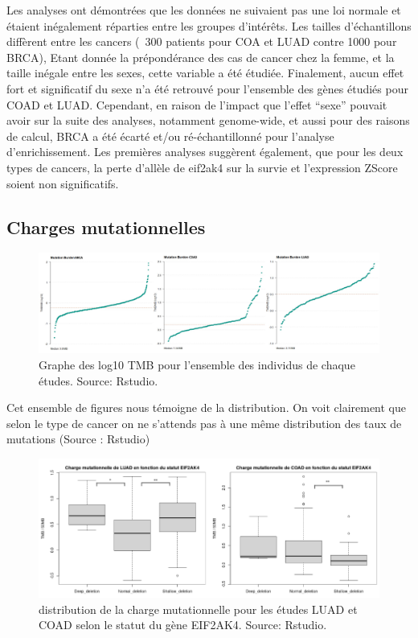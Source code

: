 \documentclass{style}
\begin{document}
Les analyses ont démontrées que les données ne suivaient pas une loi normale et étaient inégalement réparties entre les groupes d'intérêts. Les tailles d’échantillons diffèrent entre les cancers (~300 patients pour COA et LUAD contre 1000 pour BRCA), Etant donnée la prépondérance des cas de cancer chez la femme, et la taille inégale entre les sexes, cette variable a été étudiée. Finalement, aucun effet fort et significatif du sexe n’a été retrouvé pour l’ensemble des gènes étudiés pour COAD et LUAD. Cependant, en raison de l’impact que l’effet “sexe” pouvait avoir sur la suite des analyses, notamment genome-wide, et aussi pour des raisons de calcul, BRCA a été écarté et/ou ré-échantillonné pour l’analyse d’enrichissement. Les premières analyses suggèrent également, que pour les deux types de cancers, la perte d’allèle de eif2ak4 sur la survie et l’expression ZScore soient non significatifs. \\

\subsection{Charges mutationnelles}
\begin{figure}[H]
  \centering
  \includegraphics[width=16cm]{images/figures/mutation_Burden_Studies.jpg}
  \caption[Graphe des log10 TMB pour l’ensemble des individus de chaque études.]{Graphe des log10 TMB pour l’ensemble des individus de chaque études. Source: Rstudio.}
  \label{fig:burden}
\end{figure}

Cet ensemble de figures nous témoigne de la distribution. On voit clairement que selon le type de cancer on ne s’attends pas à une même distribution des taux de mutations (Source : Rstudio)

\begin{figure}[H]
  \centering
  \includegraphics[width=16cm]{images/figures/boxplots.png}
  \caption[distribution de la charge mutationnelle pour les études LUAD et COAD selon le statut du gène EIF2AK4.]{distribution de la charge mutationnelle pour les études LUAD et COAD selon le statut du gène EIF2AK4. Source: Rstudio.}
  \label{fig:burden}
\end{figure}
\end{document}
